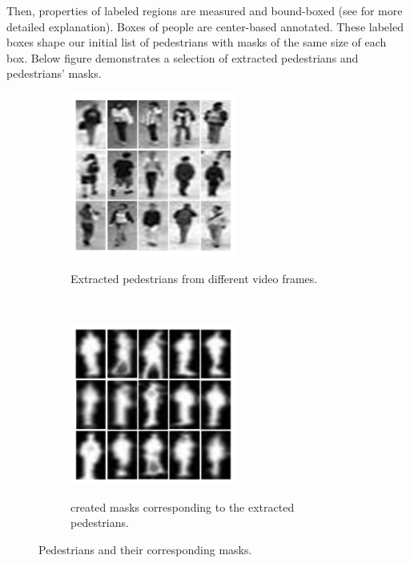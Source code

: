 \begin{enumerate}
Then, properties of labeled regions are measured and bound-boxed (see \cite{van2014scikit} for more detailed explanation). Boxes of people are center-based annotated. These labeled boxes shape our initial list of pedestrians with masks of the same size of each box. Below figure demonstrates a selection of extracted pedestrians and pedestrians' masks.

\begin{figure}[h!]
    \centering
    \begin{subfigure}[t]{0.5\textwidth}
        \centering
        {\includegraphics[width=0.6\textwidth]{images/peds}}
        \caption{Extracted pedestrians from different video frames.}
    \end{subfigure}%
    ~ 
    \begin{subfigure}[t]{0.5\textwidth}
        \centering
        {\includegraphics[width=0.6\textwidth]{images/masks}}
        \caption{created masks corresponding to the extracted pedestrians.}
    \end{subfigure}
    \caption{Pedestrians and their corresponding masks.}
    \label{backback}
\end{figure}



\end{enumerate}
